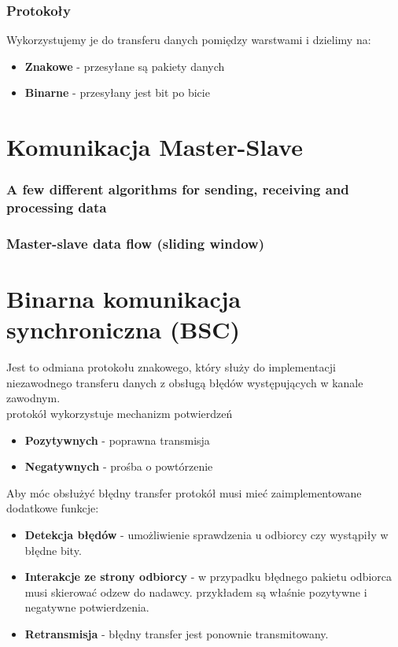 \documentclass[a4paper,twoside]{article}
\begin{document}
\section{Protokoły}
Wykorzystujemy je do transferu danych pomiędzy warstwami i dzielimy na:
\begin{itemize}
	\item \textbf{Znakowe} - przesyłane są pakiety danych
	\item \textbf{Binarne} - przesyłany jest bit po bicie
\end{itemize}



\part{Komunikacja Master-Slave}
\section{A few different algorithms for sending, receiving and processing data}
\section{Master-slave data flow (sliding window)}




\part{Binarna komunikacja synchroniczna (BSC)}
Jest to odmiana protokołu znakowego, który służy do implementacji niezawodnego transferu danych z obsługą błędów występujących w kanale zawodnym.\\
protokół wykorzystuje mechanizm potwierdzeń
\begin{itemize}
	\item \textbf{Pozytywnych} - poprawna transmisja
	\item \textbf{Negatywnych} - prośba o powtórzenie
\end{itemize}
Aby móc obsłużyć błędny transfer protokół musi mieć zaimplementowane dodatkowe funkcje:
\begin{itemize}
	\item \textbf{Detekcja błędów} - umożliwienie sprawdzenia u odbiorcy czy wystąpiły w błędne bity.
	\item \textbf{Interakcje ze strony odbiorcy} - w przypadku błędnego pakietu odbiorca musi skierować odzew do nadawcy. przykładem są właśnie pozytywne i negatywne potwierdzenia.
	\item \textbf{Retransmisja} - błędny transfer jest ponownie transmitowany.
\end{itemize}
\end{document}

